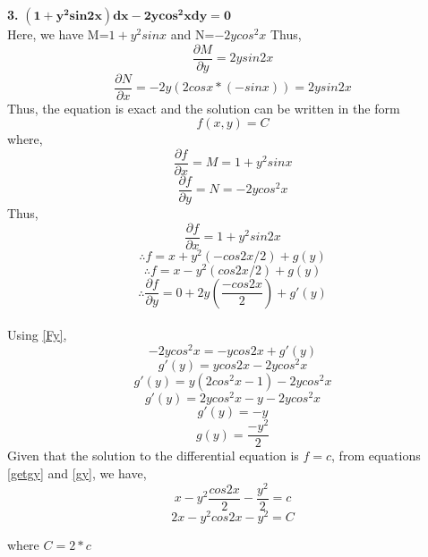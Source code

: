 \documentclass{article}
\begin{document}
\textbf{3. }$\mathbf{(1+y^2sin2x)dx - 2ycos^2xdy = 0}$\\
Here, we have M=$1+y^2sinx$ and N=$-2ycos^2x$
Thus,\\
\[\frac{\partial M}{\partial y} = 2ysin2x\]
\[\frac{\partial N}{\partial x} = -2y(2 cosx * (-sin x)) = 2ysin2x\]
Thus, the equation is exact and the solution can be written in the form \begin{equation*}f(x,y)=C\end{equation*} where,
\begin{equation}
\frac{\partial f}{\partial x} = M = 1+y^2sinx \label{Fx}
\end{equation}
\begin{equation}
\frac{\partial f}{\partial y} = N = -2ycos^2x \label{Fy}
\end{equation}
Thus,\\
\[\frac{\partial f}{\partial x} = 1 + y^2sin2x\]
\[\therefore f = x + y^2(-cos2x/2) + g(y)\]
\begin{equation}
\therefore f = x - y^2(cos2x/2) + g(y) \label{getgy}
\end{equation}
\[\therefore \frac{\partial f}{\partial y}=0 + 2y \left(\frac{-cos2x}{2}\right) +g'(y)\]\\
Using \eqref{Fy},
\[-2ycos^2x = -ycos2x + g'(y)\]
\[g'(y) = ycos2x-2ycos^2x\]
\[g'(y) = y (2cos^2x - 1) - 2ycos^2x\]
\[g'(y) = 2ycos^2x -y - 2ycos^2x\]
\[g'(y) = -y\]
\begin{equation}
g(y) = \frac{-y^2}{2} \label{gy}
\end{equation}
Given that the solution to the differential equation is $f = c$,
from equations \eqref{getgy} and \eqref{gy}, we have,\\
\[x-y^2\frac{cos2x}{2} -\frac{y^2}{2}=c\]
\[2x-y^2cos2x-y^2=C\]
\begin{center}
where $C=2*c$
\end{center}
\end{document}
